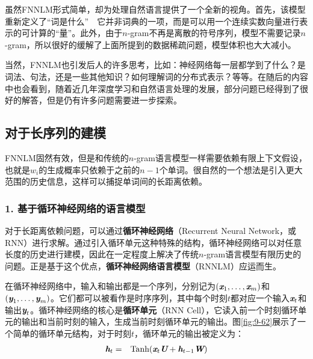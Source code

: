 \parinterval  虽然FNNLM形式简单，却为处理自然语言提供了一个全新的视角。首先，该模型重新定义了“词是什么”\ \dash \ 它并非词典的一项，而是可以用一个连续实数向量进行表示的可计算的“量”。此外，由于$n$-gram不再是离散的符号序列，模型不需要记录$n$-gram，所以很好的缓解了上面所提到的数据稀疏问题，模型体积也大大减小。

\parinterval  当然，FNNLM也引发后人的许多思考，比如：神经网络每一层都学到了什么？是词法、句法，还是一些其他知识？如何理解词的分布式表示？等等。在随后的内容中也会看到，随着近几年深度学习和自然语言处理的发展，部分问题已经得到了很好的解答，但是仍有许多问题需要进一步探索。


\subsection{对于长序列的建模}

\parinterval  FNNLM固然有效，但是和传统的$n$-gram语言模型一样需要依赖有限上下文假设，也就是$ w_i $的生成概率只依赖于之前的$ n-1 $个单词。很自然的一个想法是引入更大范围的历史信息，这样可以捕捉单词间的长距离依赖。


\subsubsection{1. 基于循环神经网络的语言模型}

\parinterval  对于长距离依赖问题，可以通过{\small\sffamily\bfseries{循环神经网络}}（Recurrent Neural Network，或RNN）进行求解。通过引入循环单元这种特殊的结构，循环神经网络可以对任意长度的历史进行建模，因此在一定程度上解决了传统$n$-gram语言模型有限历史的问题。正是基于这个优点，{\small\sffamily\bfseries{循环神经网络语言模型}}（RNNLM）应运而生。

\parinterval  在循环神经网络中，输入和输出都是一个序列，分别记为$ ({\textbf{\em x}}_1,\dots,{\textbf{\em x}}_m) $和$ ({\textbf{\em y}}_1,\dots,\\ {\textbf{\em y}}_m) $。它们都可以被看作是时序序列，其中每个时刻$ t $都对应一个输入$ {\textbf{\em x}}_t $和输出$ {\textbf{\em y}}_t $。循环神经网络的核心是{\small\sffamily\bfseries{循环单元}}（RNN Cell），它读入前一个时刻循环单元的输出和当前时刻的输入，生成当前时刻循环单元的输出。图\ref{fig:9-62}展示了一个简单的循环单元结构，对于时刻$ t $，循环单元的输出被定义为：
\begin{eqnarray}
{\textbf{\em h}}_t&=&{\textrm{Tanh}}({\textbf{\em x}}_t{\textbf{\em U}}+{\textbf{\em h}}_{t-1}{\textbf{\em W}})
\label{eq:9-63}
\end{eqnarray}

